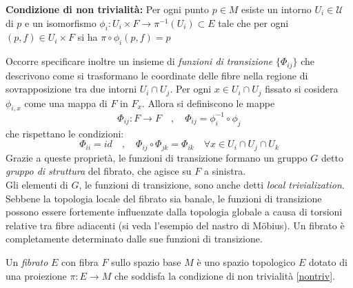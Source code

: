 \begin{axiom}\textbf{Condizione di non trivialità:} \label{nontriv}
      Per ogni punto $p \in M$ esiste un intorno $U_i \in \mathcal{U}$ di $p$ e un isomorfismo
      $\phi_i : U_i \times F \to \pi^{-1}(U_i) \subset E$ tale che per ogni
      $(p,f) \in U_i \times F$ si ha $\pi \circ \phi_i(p,f) = p$
\end{axiom}

Occorre specificare inoltre un insieme di \emph{funzioni di transizione} $\{\Phi_{ij}\}$ che
descrivono come si trasformano le coordinate delle fibre nella regione di
sovrapposizione tra due intorni $U_i \cap U_j$. Per ogni $x \in U_i \cap U_j$ fissato si
cosidera $\phi_{i,x}$ come una mappa di $F$ in $F_x$.
Allora si definiscono le mappe
$$ \Phi_{ij} : F \to F \quad , \quad \Phi_{ij} = \phi_i^{-1} \circ\phi_j $$
che rispettano le condizioni:
$$ \Phi_{ii} = id \quad , \quad \Phi_{ij} \circ \Phi_{jk} = \Phi_{ik}
   \quad \forall x \in U_i \cap U_j \cap U_k $$
Grazie a queste proprietà, le funzioni di transizione formano un gruppo $G$ detto
\emph{gruppo di struttura} del fibrato, che agisce su $F$ a sinistra.\\
Gli elementi di $G$, le funzioni di transizione, sono anche detti
\emph{local trivialization}.\\

Sebbene la topologia locale del fibrato sia banale, le funzioni di transizione
possono essere fortemente influenzate dalla topologia globale a causa di torsioni
relative tra fibre adiacenti (si veda l'esempio del nastro di Möbius). Un fibrato
è completamente determinato dalle sue funzioni di transizione.\\

\begin{definition}
   Un \emph{fibrato} $E$ con fibra $F$ sullo spazio base $M$ è uno spazio topologico
   $E$ dotato di una proiezione $\pi : E \to M$ che soddisfa la condizione di
   non trivialità \ref{nontriv}.
\end{definition}

